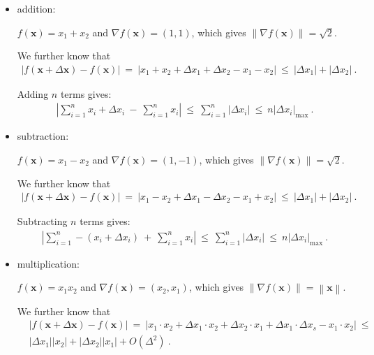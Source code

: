 \documentclass{article}
\newcommand\Bx{\bm{x}}
\renewcommand{\leq}{\leqslant}
\begin{document}
\begin{itemize}
\item addition:

$f(\Bx)=x_1+x_2$ and $\nabla f(\Bx)=(1,1)$, which gives
$\left\| \nabla f(\Bx)\right\|=\sqrt{2}$.

We further know that
\begin{align}
\left|f(\Bx +\Delta \Bx) -f(\Bx)\right| \ 
= \ \left| x_1+x_2 +\Delta x_1 + \Delta x_2 - x_1 - x_2 \right| \ \leq
  \ \left| \Delta x_1 \right|  + \left| \Delta x_2 \right| \ .
\end{align}

Adding $n$ terms gives:
\begin{align}
\left| \sum_{i=1}^n x_i + \Delta x_i  \ - \ \sum_{i=1}^n x_i \right| 
\ \leq \ \sum_{i=1}^n \left| \Delta x_i \right| \ \leq \ n \left|
  \Delta x_i\right|_{\mathrm{max}}  \ .
\end{align}


\item subtraction:

$f(\Bx)=x_1-x_2$ and $\nabla f(\Bx)=(1,-1)$, which gives
$\left\| \nabla f(\Bx)\right\|=\sqrt{2}$.

We further know that
\begin{align}
\left|f(\Bx +\Delta \Bx) -f(\Bx)\right| \ 
= \ \left| x_1-x_2 +\Delta x_1 - \Delta x_2 - x_1 + x_2 \right| \ \leq
  \ \left| \Delta x_1 \right|  + \left| \Delta x_2 \right| \ .
\end{align}

Subtracting $n$ terms gives:
\begin{align}
\left| \sum_{i=1}^n -(x_i + \Delta x_i)  \ + \ \sum_{i=1}^n x_i \right| 
\ \leq \ \sum_{i=1}^n \left| \Delta x_i \right| \ \leq \ n \left|
  \Delta x_i\right|_{\mathrm{max}}  \ . 
\end{align}

\item multiplication:

$f(\Bx)=x_1 x_2$ and $\nabla f(\Bx)=(x_2,x_1)$, which gives
$\left\| \nabla f(\Bx)\right\|= \left\| \Bx \right\|$.

We further know that
\begin{align}
&\left|f(\Bx +\Delta \Bx) -f(\Bx)\right| \ 
= \ \left| x_1 \cdot x_2 +\Delta x_1 \cdot x_2 + \Delta x_2 \cdot x_1 + \Delta x_1 \cdot \Delta x_s - x_1  \cdot x_2 \right| \ \leq
  \\ \nonumber 
&\left| \Delta x_1 \right|  \left|  x_2 \right| + \left| \Delta x_2
  \right|  \left|  x_1 \right| +O(\Delta^2) \ .
\end{align}


\end{itemize}
\end{document}
